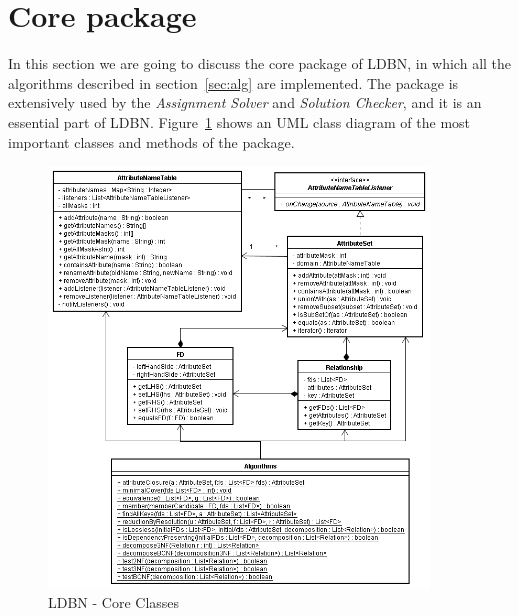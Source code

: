\section{Core package}
In this section we are going to discuss the core package of LDBN, in which all 
the algorithms described in section~\ref{sec:alg} are implemented. 
The package is extensively
used by the \textit{Assignment Solver} and \textit{Solution Checker}, and it is 
an essential part of LDBN. Figure~\ref{fig:coreuml} shows an UML class diagram
of the most important classes and methods of the package. 

\begin{figure}[h]
	\begin{center}
		\includegraphics[width=0.9\textwidth]{./img/uml02.png}
		\caption{LDBN - Core Classes}
		\label{fig:coreuml}
	\end{center}
\end{figure}

